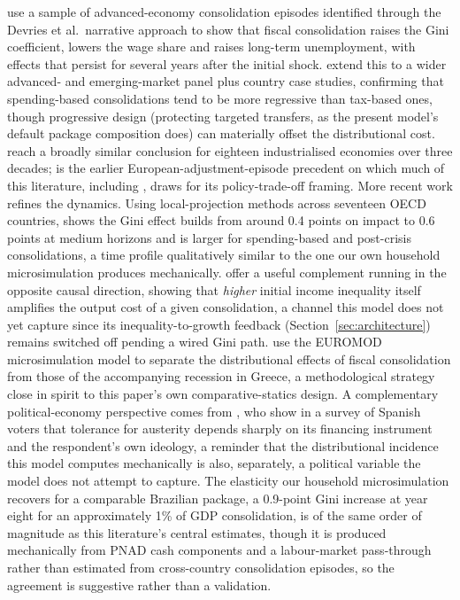 \documentclass[11pt,a4paper]{article}
\begin{document}
\citet{ballfurcerilleighlloungani2013} use a sample of advanced-economy consolidation episodes identified through the Devries et al.\ narrative approach to show that fiscal consolidation raises the Gini coefficient, lowers the wage share and raises long-term unemployment, with effects that persist for several years after the initial shock. \citet{woobovakindazhang2017} extend this to a wider advanced- and emerging-market panel plus country case studies, confirming that spending-based consolidations tend to be more regressive than tax-based ones, though progressive design (protecting targeted transfers, as the present model's default package composition does) can materially offset the distributional cost. \citet{agnellosousa2014,agnellosousa2012b} reach a broadly similar conclusion for eighteen industrialised economies over three decades; \citet{mulasgranados2005,mulasgranados2006book} is the earlier European-adjustment-episode precedent on which much of this literature, including \citet{ballfurcerilleighlloungani2013}, draws for its policy-trade-off framing. More recent work refines the dynamics. Using local-projection methods across seventeen OECD countries, \citet{heimberger2020} shows the Gini effect builds from around 0.4 points on impact to 0.6 points at medium horizons and is larger for spending-based and post-crisis consolidations, a time profile qualitatively similar to the one our own household microsimulation produces mechanically. \citet{brincaetal2021} offer a useful complement running in the opposite causal direction, showing that \emph{higher} initial income inequality itself amplifies the output cost of a given consolidation, a channel this model does not yet capture since its inequality-to-growth feedback (Section~\ref{sec:architecture}) remains switched off pending a wired Gini path. \citet{leventimatsaganis2013} use the EUROMOD microsimulation model to separate the distributional effects of fiscal consolidation from those of the accompanying recession in Greece, a methodological strategy close in spirit to this paper's own comparative-statics design. A complementary political-economy perspective comes from \citet{lagopenasetal2024}, who show in a survey of Spanish voters that tolerance for austerity depends sharply on its financing instrument and the respondent's own ideology, a reminder that the distributional incidence this model computes mechanically is also, separately, a political variable the model does not attempt to capture. The elasticity our household microsimulation recovers for a comparable Brazilian package, a 0.9-point Gini increase at year eight for an approximately 1\% of GDP consolidation, is of the same order of magnitude as this literature's central estimates, though it is produced mechanically from PNAD cash components and a labour-market pass-through rather than estimated from cross-country consolidation episodes, so the agreement is suggestive rather than a validation.
\end{document}

